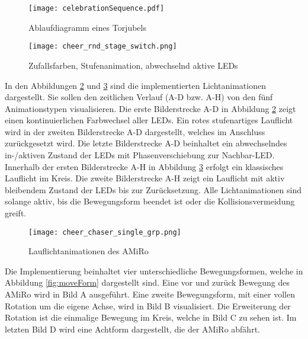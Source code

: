 \begin{figure}[H]
	\begin{center}
		\texttt{[image: celebrationSequence.pdf]} 	
		\caption{Ablaufdiagramm eines Torjubels}
		\label{fig:celebrationSequence}
	\end{center}
\end{figure}

\begin{figure}[H]
	\begin{center}
		\texttt{[image: cheer\_rnd\_stage\_switch.png]} 	
		\caption{Zufallsfarben, Stufenanimation, abwechselnd aktive LEDs}
		\label{fig:cheer_rnd_stage_switch}
	\end{center}
\end{figure}

In den Abbildungen \ref{fig:cheer_rnd_stage_switch} und \ref{fig:cheer_chaser_single_grp} sind die implementierten Lichtanimationen dargestellt. Sie sollen den zeitlichen Verlauf (A-D bzw. A-H) von den fünf Animationstypen visualisieren. Die erste Bilderstrecke A-D in Abbildung \ref{fig:cheer_rnd_stage_switch} zeigt einen kontinuierlichen Farbwechsel aller LEDs. Ein rotes stufenartiges Lauflicht wird in der zweiten Bilderstrecke A-D dargestellt, welches im Anschluss zurückgesetzt wird. Die letzte Bilderstrecke A-D beinhaltet ein abwechselndes in-/aktiven Zustand der LEDs mit Phasenverschiebung zur Nachbar-LED.
Innerhalb der ersten Bilderstrecke A-H in Abbildung \ref{fig:cheer_chaser_single_grp} erfolgt ein klassisches Lauflicht im Kreis. Die zweite Bilderstrecke A-H zeigt ein Lauflicht mit aktiv bleibendem Zustand der LEDs bis zur Zurücksetzung. Alle Lichtanimationen sind solange aktiv, bis die Bewegungsform beendet ist oder die Kollisionsvermeidung greift.

\begin{figure}[h]
	\begin{center}
		\texttt{[image: cheer\_chaser\_single\_grp.png]} 	
		\caption{Lauflichtanimationen des AMiRo}
		\label{fig:cheer_chaser_single_grp}
	\end{center}
\end{figure}

Die Implementierung beinhaltet vier unterschiedliche Bewegungsformen, welche in Abbildung \ref{fig:moveForm} dargestellt sind. Eine vor und zurück Bewegung des AMiRo wird in Bild A ausgeführt. Eine zweite Bewegungsform, mit einer vollen Rotation um die eigene Achse, wird in Bild B visualisiert. Die Erweiterung der Rotation ist die einmalige Bewegung im Kreis, welche in Bild C zu sehen ist. Im letzten Bild D wird eine Achtform dargestellt, die der AMiRo abfährt.

